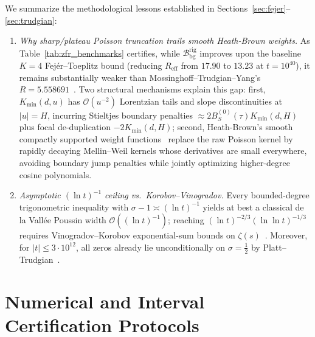 \documentclass[11pt,reqno]{amsart}
\theoremstyle{definition}
\theoremstyle{remark}
\numberwithin{equation}{section}
\begin{document}
We summarize the methodological lessons established in Sections~\ref{sec:fejer}--\ref{sec:trudgian}:
\begin{enumerate}[label=\textup{(\arabic*)},leftmargin=2.2em]
\item \textit{Why sharp/plateau Poisson truncation trails smooth Heath-Brown weights.} As Table~\ref{tab:zfr_benchmarks} certifies, while $\mathcal{B}_{\mathrm{bg}}^{\mathrm{rig}}$ improves upon the baseline $K = 4$ Fej\'er--Toeplitz bound (reducing $R_{\mathrm{eff}}$ from $17.90$ to $13.23$ at $t = 10^{40}$), it remains substantially weaker than Mossinghoff--Trudgian--Yang's $R = 5.558691$~\cite{mty2024}. Two structural mechanisms explain this gap: first, $K_{\min}(d,u)$ has $\mathcal{O}(u^{-2})$ Lorentzian tails and slope discontinuities at $\lvert u\rvert = H$, incurring Stieltjes boundary penalties $\approx 2B_S^{(0)}(\tau)K_{\min}(d,H)$ plus focal de-duplication $-2K_{\min}(d,H)$; second, Heath-Brown's smooth compactly supported weight functions~\cite{heathbrown1992,mty2024} replace the raw Poisson kernel by rapidly decaying Mellin--Weil kernels whose derivatives are small everywhere, avoiding boundary jump penalties while jointly optimizing higher-degree cosine polynomials.
\item \textit{Asymptotic $(\ln t)^{-1}$ ceiling vs.\ Korobov--Vinogradov.} Every bounded-degree trigonometric inequality with $\sigma - 1 \asymp (\ln t)^{-1}$ yields at best a classical de la Vall\'ee Poussin width $\mathcal{O}((\ln t)^{-1})$; reaching $(\ln t)^{-2/3}(\ln\ln t)^{-1/3}$ requires Vinogradov--Korobov exponential-sum bounds on $\zeta(s)$~\cite{korobov1958,vinogradov1958,mty2024}. Moreover, for $\lvert t\rvert \le 3 \cdot 10^{12}$, all zeros already lie unconditionally on $\sigma = \frac{1}{2}$ by Platt--Trudgian~\cite{platttrudgian2021}.
\end{enumerate}

\appendix

\section{Numerical and Interval Certification Protocols}\label{app:interval}
\end{document}
